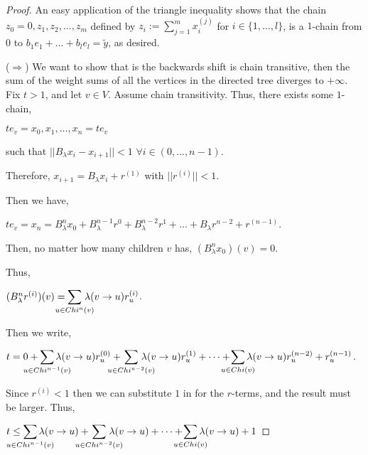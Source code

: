 \documentclass{article}
\begin{document}
\begin{enumerate}
\begin{proof}
An easy application of the triangle inequality shows that the chain $z_0=0,z_1,z_2,\dots,z_m$ defined by $z_i := \displaystyle\sum^m_{j=1} x^{(j)}_i$ for $i\in \{1,\dots,l\}$, is a $1$-chain from $0$ to $b_1e_1+\dots+b_le_l=\tilde{y}$, as desired. 


($\Rightarrow$) We want to show that is the backwards shift is chain transitive, then the sum of the weight sums of all the vertices in the directed tree diverges to $+\infty$. Fix $t>1$, and let $v\in V$. Assume chain transitivity. Thus, there exists some $1$-chain, 

\smallskip

\centerline{$te_v = x_0, x_1,\dots,x_n = te_v$}

\smallskip

such that $||B_\lambda x_i-x_{i+1}||<1$ $\forall i \in (0,\dots,n-1)$.

Therefore, $x_{i+1}=B_\lambda x_i +r^{(1)}$ with $||r^{(i)}||<1$.

Then we have,

\smallskip

\centerline{$te_v=x_n=B_\lambda^n x_0 + B^{n-1}_\lambda r^{0}+B^{n-2}_\lambda r^{1}+\dots+B_\lambda r^{n-2}+r^{(n-1)}$.}

Then, no matter how many children $v$ has, $(B^n_\lambda x_0)(v)=0$.

Thus,

\centerline{$(B^n_\lambda r^{(i)})(v)= \hspace{-0.45cm} \displaystyle\sum_{u\in {Chi}^n(v)}\hspace{-0.4cm}\lambda(v\rightarrow u) r^{(i)}_u$.}

Then we write,

\medskip

\centerline{$t=0+\hspace{-0.6cm} \displaystyle\sum_{u\in {Chi}^{n-1}(v)}\hspace{-0.6cm}\lambda(v\rightarrow u)r_u^{(0)}
+
\hspace{-0.55cm} \displaystyle\sum_{u\in {Chi}^{n-2}(v)}\hspace{-0.55cm}\lambda(v\rightarrow u)r_u^{(1)}
+\dots+
\hspace{-0.4cm} \displaystyle\sum_{u\in {Chi}(v)}\hspace{-0.35cm}\lambda(v\rightarrow u)r_u^{(n-2)}
+
r_u^{(n-1)}$.}

Since $r^{(i)}<1$ then we can substitute $1$ in for the $r$-terms, and the result must be larger. Thus, 

\centerline{$t\leq \hspace{-0.6cm} \displaystyle\sum_{u\in {Chi}^{n-1}(v)}\hspace{-0.6cm}\lambda(v\rightarrow u)
+
\hspace{-0.55cm} \displaystyle\sum_{u\in {Chi}^{n-2}(v)}\hspace{-0.55cm}\lambda(v\rightarrow u)
+\dots+
\hspace{-0.4cm} \displaystyle\sum_{u\in {Chi}(v)}\hspace{-0.35cm}\lambda(v\rightarrow u)
+
1$}


\end{proof}
\end{enumerate}
\end{document}
